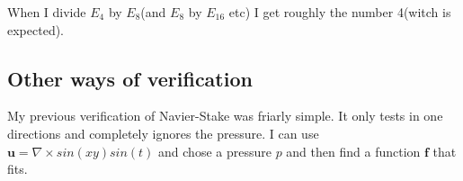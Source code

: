 \documentclass[12pt,a4paper,english]{article}
\begin{document}
When I divide $E_4$ by $E_8$(and $E_8$ by $E_{16}$ etc) I get roughly the number 4(witch is expected).

\subsection*{Other ways of verification}
My previous verification of Navier-Stake was friarly simple. It only tests in one directions and completely ignores the pressure. I can use $\textbf{u} = \nabla \times sin(xy)sin(t)$ and chose a pressure $p$ and then find a function $\textbf{f}$ that fits. 
\end{document}

